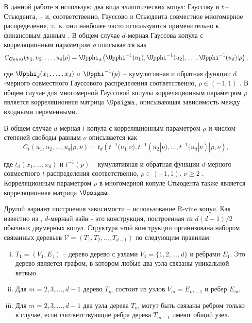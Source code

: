 В данной работе я использую два вида эллиптических копул: Гауссову и $t$\,--\,Стьюдента, -- и, соответственно, Гауссово и Стьюдента совместное многомерное распределение, т.~к. они наиболее часто используются применительно к финансовым данным \cite{Lourme2016}. 
В общем случае $d$-мерная Гауссова копула с корреляционным параметром $\rho$ описывается как
%
\begin{equation} \label{nCop}
C_{Gauss}(u_1,u_2,\ldots,u_d|\rho) = \Upphi_d \left( \Upphi^{-1} (u_1), \Upphi^{-1} (u_2), \ldots, \Upphi^{-1} (u_d) | \rho \right),
\end{equation}

\noindent где $\Upphi_d(x_1,\dots,x_d)$ и $\Upphi^{-1}(p)$ -- кумулятивная и обратная функции $d$-мерного совместного Гауссового распределения соответственно, $\rho \in (-1, 1)$ \cite{Emb2001}. 
В общем случае для многомерной Гауссовой копулы корреляционным параметром $\rho$ является корреляционная матрица $\Upsigma$, описывающая зависимость между входными переменными.

В общем случае $d$-мерная $t$-копула с корреляционным параметром $\rho$ и числом степеней свободы равным $\nu$ описывается как
%
\begin{equation} \label{tCop}
C_{t}(u_1,u_2,\ldots,u_d|\rho, \nu) = t_d \left( t^{-1} (u_1|\nu), t^{-1} (u_2|\nu), \ldots, t^{-1} (u_d|\nu) | \rho, \nu \right),
\end{equation}

\noindent где $t_d(x_1,\dots,x_d)$ и $t^{-1}(p)$ -- кумулятивная и обратная функции $d$-мерного совместного $t$-распределения соответственно, $\rho \in (-1, 1)$, $\nu \ge 2$ \cite{Emb2001}. 
Корреляционным параметром $\rho$ в многомерной копуле Стьюдента также является корреляционная матрица $\Upsigma$.

Другой вариант построения зависимости -- использование R-vine копул. Как известно из \cite{Bedfort2002}, $d$-мерный вайн - это конструкция, построенная из $d(d - 1)/2$ обычных двумерных копул. Структура этой конструкции организована набором связанных деревьев $\mathcal{V} = (T_1, T_2, \ldots, T_ {d-1})$ по следующим правилам:

\begin{enumerate}[(i)]
\item $T_1 = (V_1,E_1)$ -- дерево дерево с узлами $V_1 = \{1, 2, \ldots, d\}$ и ребрами $E_1$. 
Это дерево является графом, в котором любые два узла связаны уникальной ветвью \cite{Diestel2005}

\item Для $m = 2,3,\ldots,d - 1$ дерево $T_m$ состоит из узлов $V_m = E_{m-1}$ и ребер $E_m$.

\item \label{iii} Для $m = 2,3,\ldots,d - 1$ два узла дерева $T_m$ могут быть связаны ребром только в случае, если соответствующие ребра дерева $T_{m-1}$ имеют общий узел.
\end{enumerate}

